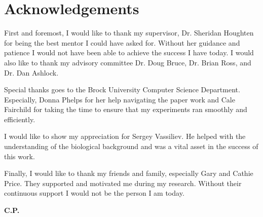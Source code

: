 \thispagestyle{empty}
\section*{Acknowledgements}


First and foremost, I would like to thank my supervisor, Dr. Sheridan Houghten for being the best mentor I could have asked for. Without her guidance and patience I would not have been able to achieve the success I have today. I would also like to thank my advisory committee Dr. Doug Bruce, Dr. Brian Ross, and Dr. Dan Ashlock.

Special thanks goes to the Brock University Computer Science Department. Especially, Donna Phelps for her help navigating the paper work and Cale Fairchild for taking the time to ensure that my experiments ran smoothly and efficiently.

I would like to show my appreciation for Sergey Vassiliev. He helped with the understanding of the biological background and was a vital asset in the success of this work.

Finally, I would like to thank my friends and family, especially Gary and Cathie Price. They supported and motivated me during my research. Without their continuous support I would not be the person I am today.

\begin{flushright}
\textbf{C.P.} %
\end{flushright}


